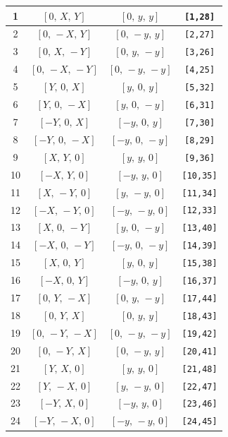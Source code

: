 \documentclass[fleqn,8pt]{jsarticle}
\begin{document}
\begin{longtable}{cccc}
1 & $\left[ 0,\, X,\, Y \right]$ & $\left[ 0,\, y,\, y \right]$ & {\tt [1,28]} \\ \hline
2 & $\left[ 0,\, - X,\, Y \right]$ & $\left[ 0,\, - y,\, y \right]$ & {\tt [2,27]} \\ \hline
3 & $\left[ 0,\, X,\, - Y \right]$ & $\left[ 0,\, y,\, - y \right]$ & {\tt [3,26]} \\ \hline
4 & $\left[ 0,\, - X,\, - Y \right]$ & $\left[ 0,\, - y,\, - y \right]$ & {\tt [4,25]} \\ \hline
5 & $\left[ Y,\, 0,\, X \right]$ & $\left[ y,\, 0,\, y \right]$ & {\tt [5,32]} \\ \hline
6 & $\left[ Y,\, 0,\, - X \right]$ & $\left[ y,\, 0,\, - y \right]$ & {\tt [6,31]} \\ \hline
7 & $\left[ - Y,\, 0,\, X \right]$ & $\left[ - y,\, 0,\, y \right]$ & {\tt [7,30]} \\ \hline
8 & $\left[ - Y,\, 0,\, - X \right]$ & $\left[ - y,\, 0,\, - y \right]$ & {\tt [8,29]} \\ \hline
9 & $\left[ X,\, Y,\, 0 \right]$ & $\left[ y,\, y,\, 0 \right]$ & {\tt [9,36]} \\ \hline
10 & $\left[ - X,\, Y,\, 0 \right]$ & $\left[ - y,\, y,\, 0 \right]$ & {\tt [10,35]} \\ \hline
11 & $\left[ X,\, - Y,\, 0 \right]$ & $\left[ y,\, - y,\, 0 \right]$ & {\tt [11,34]} \\ \hline
12 & $\left[ - X,\, - Y,\, 0 \right]$ & $\left[ - y,\, - y,\, 0 \right]$ & {\tt [12,33]} \\ \hline
13 & $\left[ X,\, 0,\, - Y \right]$ & $\left[ y,\, 0,\, - y \right]$ & {\tt [13,40]} \\ \hline
14 & $\left[ - X,\, 0,\, - Y \right]$ & $\left[ - y,\, 0,\, - y \right]$ & {\tt [14,39]} \\ \hline
15 & $\left[ X,\, 0,\, Y \right]$ & $\left[ y,\, 0,\, y \right]$ & {\tt [15,38]} \\ \hline
16 & $\left[ - X,\, 0,\, Y \right]$ & $\left[ - y,\, 0,\, y \right]$ & {\tt [16,37]} \\ \hline
17 & $\left[ 0,\, Y,\, - X \right]$ & $\left[ 0,\, y,\, - y \right]$ & {\tt [17,44]} \\ \hline
18 & $\left[ 0,\, Y,\, X \right]$ & $\left[ 0,\, y,\, y \right]$ & {\tt [18,43]} \\ \hline
19 & $\left[ 0,\, - Y,\, - X \right]$ & $\left[ 0,\, - y,\, - y \right]$ & {\tt [19,42]} \\ \hline
20 & $\left[ 0,\, - Y,\, X \right]$ & $\left[ 0,\, - y,\, y \right]$ & {\tt [20,41]} \\ \hline
21 & $\left[ Y,\, X,\, 0 \right]$ & $\left[ y,\, y,\, 0 \right]$ & {\tt [21,48]} \\ \hline
22 & $\left[ Y,\, - X,\, 0 \right]$ & $\left[ y,\, - y,\, 0 \right]$ & {\tt [22,47]} \\ \hline
23 & $\left[ - Y,\, X,\, 0 \right]$ & $\left[ - y,\, y,\, 0 \right]$ & {\tt [23,46]} \\ \hline
24 & $\left[ - Y,\, - X,\, 0 \right]$ & $\left[ - y,\, - y,\, 0 \right]$ & {\tt [24,45]} \\
\end{longtable}
\end{document}
